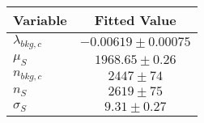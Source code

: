 \begin{tabular}[t]{lc}
\hline
Variable &Fitted Value\\
\hline\hline
$\lambda_{bkg,c}$&$-0.00619\pm0.00075$\\
\hline
$\mu_{S}$&$1968.65\pm0.26$\\
\hline
$n_{bkg,c}$&$2447\pm74$\\
\hline
$n_{S}$&$2619\pm75$\\
\hline
$\sigma_{S}$&$9.31\pm0.27$\\
\hline
\end{tabular}